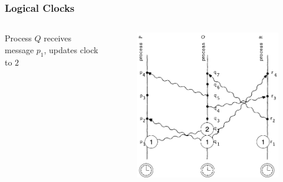 \documentclass{beamer}
\begin{document}
\frame
{
	\frametitle{Logical Clocks}

	\begin{columns}
	\begin{column}{0.6\textwidth}

		Process $Q$ receives message $p_1$, updates clock to $2$


	\end{column}
	\begin{column}{0.4\textwidth}

		\begin{figure}[ht!]
		\includegraphics[width=\textwidth]{files/ClockDist-Impl-Logical-Clock-1.png}
		\end{figure}


	\end{column}
	\end{columns}


}
\end{document}
